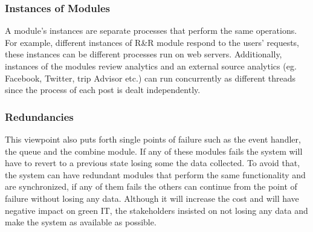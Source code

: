 \subsubsection{Instances of Modules}

A module's instances are separate processes that perform the same operations. For example, different instances of R\&R module respond to the users' requests, these instances can be different processes run on web servers. Additionally, instances of the modules review analytics and an external source analytics (eg. Facebook, Twitter, trip Advisor etc.) can run concurrently as different threads since the process of each post is dealt independently.

\subsubsection{Redundancies}

This viewpoint also puts forth single points of failure such as the event handler, the queue and the combine module. If any of these modules fails the system will have to revert to a previous state losing some the data collected. To avoid that, the system can have redundant modules that perform the same functionality and are synchronized, if any of them fails the others can continue from the point of failure without losing any data. Although it will increase the cost and will have negative impact on green IT, the stakeholders insisted on not losing any data and make the system as available as possible.
